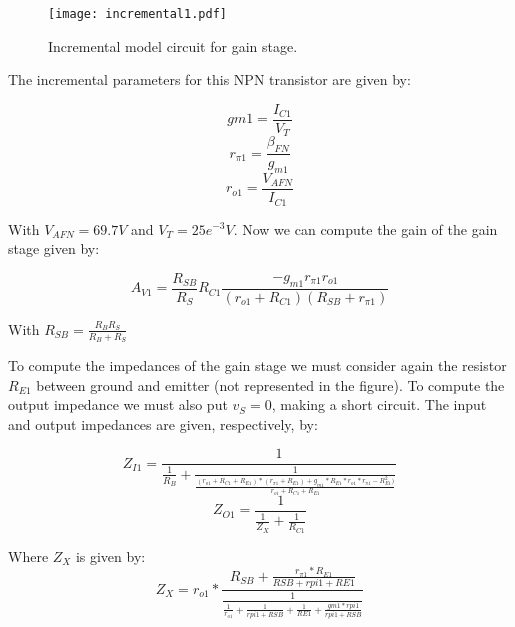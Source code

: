 \begin{figure}[H] \centering
\texttt{[image: incremental1.pdf]}
\caption{Incremental model circuit for gain stage.}
\label{fig:inc1}
\end{figure}

\par The incremental parameters for this NPN transistor are given by:

\begin{equation}
gm1=\frac{I_{C1}}{V_T}
\end{equation}
\begin{equation}
r_{\pi 1}=\frac{\beta _{FN}}{g_{m1}}
\end{equation}
\begin{equation}
r_{o1}=\frac{V_{AFN}}{I_{C1}}
\end{equation}

\par With $V_{AFN}=69.7V$ and $V_T=25e^{-3}V$. Now we can compute the gain of the gain stage given by:

\begin{equation}
A_{V1}=\frac{R_{SB}}{R_S}R_{C1}\frac{-g_{m1}r_{\pi 1}r_{o1}}{(r_{o1}+R_{C1})(R_{SB}+r_{\pi 1})}
\end{equation}
\par With $R_{SB}=\frac {R_BR_S}{R_B+R_S}$

\par To compute the impedances of the gain stage we must consider again the resistor $R_{E1}$ between ground and emitter (not represented in the figure). To compute the output impedance we must also put $v_S=0$, making a short circuit. The input and output impedances are given, respectively, by:

\begin{equation}
Z_{I1}=\frac{1}{\frac{1}{R_B}+\frac{1}{\frac{(r_{o1}+R_{C1}+R_{E1})*(r_{\pi 1}+R_{E1})+g_{m1}*R_{E1}*r_{o1}*r_{\pi 1} - R_{E1}^2)}{r_{o1}+R_{C1}+R_{E1}}}}
\end{equation} 
\begin{equation}
Z_{O1} = \frac{1}{\frac{1}{Z_X}+\frac{1}{R_{C1}}}
\end{equation}
\par Where $Z_X$ is given by:
\begin{equation}
Z_X = r_{o1}*\frac{R_{SB}+\frac{r_{\pi 1}*R_{E1}}{RSB+rpi1+RE1}}{\frac{1}{\frac{1}{r_{o1}}+\frac{1}{rpi1+RSB}+\frac{1}{RE1}+\frac{gm1*rpi1}{rpi1+RSB}}}
\end{equation}

